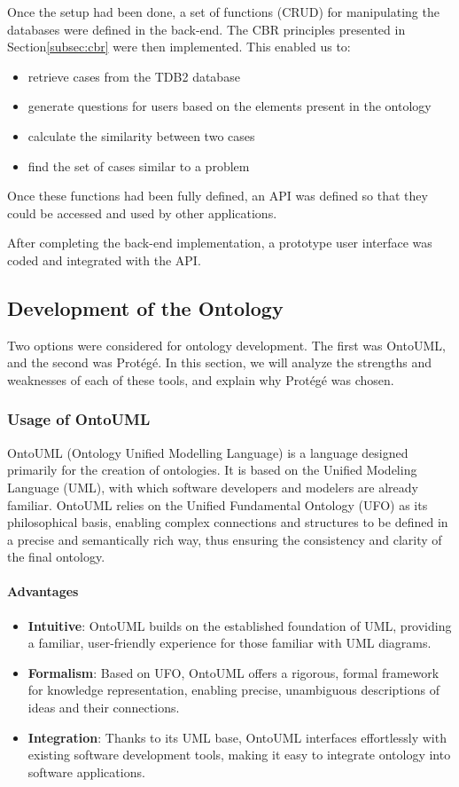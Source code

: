 Once the setup had been done, a set of functions (CRUD) for manipulating the databases were defined in the back-end. The CBR principles presented in Section\ref{subsec:cbr} were then implemented. This enabled us to:
\begin{itemize}
    \item retrieve cases from the TDB2 database
    \item generate questions for users based on the elements present in the ontology
    \item calculate the similarity between two cases
    \item find the set of cases similar to a problem
\end{itemize}

Once these functions had been fully defined, an API was defined so that they could be accessed and used by other applications.

After completing the back-end implementation, a prototype user interface was coded and integrated with the API.


\subsection{Development of the Ontology}
Two options were considered for ontology development. The first was OntoUML, and the second was Protégé. In this section, we will analyze the strengths and weaknesses of each of these tools, and explain why Protégé was chosen.

    \subsubsection{Usage of OntoUML}
    OntoUML (Ontology Unified Modelling Language) is a language designed primarily for the creation of ontologies. It is based on the Unified Modeling Language (UML), with which software developers and modelers are already familiar. OntoUML relies on the Unified Fundamental Ontology (UFO) as its philosophical basis, enabling complex connections and structures to be defined in a precise and semantically rich way, thus ensuring the consistency and clarity of the final ontology.
    
    \paragraph{Advantages}
        \begin{itemize}
            \item \textbf{Intuitive}: OntoUML builds on the established foundation of UML, providing a familiar, user-friendly experience for those familiar with UML diagrams.
            \item \textbf{Formalism}: Based on UFO, OntoUML offers a rigorous, formal framework for knowledge representation, enabling precise, unambiguous descriptions of ideas and their connections.
            \item \textbf{Integration}: Thanks to its UML base, OntoUML interfaces effortlessly with existing software development tools, making it easy to integrate ontology into software applications.
        \end{itemize}
        
